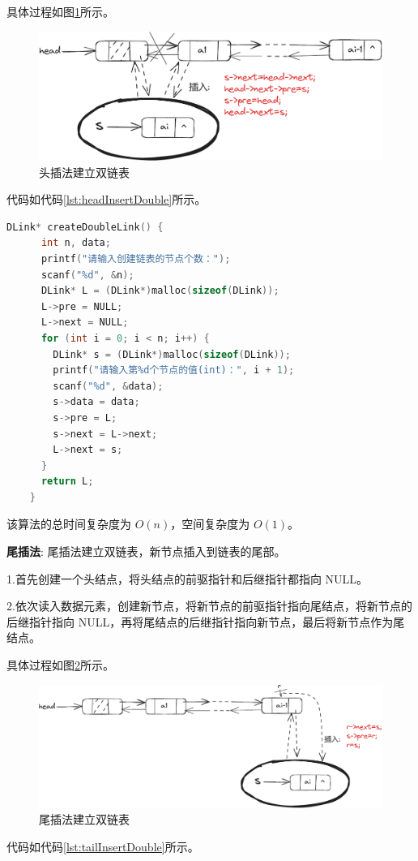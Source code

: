 \documentclass[lang=cn,newtx,10pt,scheme=chinese]{../elegantbook}
\begin{document}
  具体过程如图\ref{fig:headInsertDouble}所示。
  \begin{figure}[!htbp]
    \centering
    \includegraphics[width=1\textwidth]{./figure/pdf/cropped/headInsertDL.pdf}
    \caption{头插法建立双链表}
    \label{fig:headInsertDouble}
  \end{figure}
  代码如代码\ref{lst:headInsertDouble}所示。
  \begin{lstlisting}[language=C++, caption={头插法建立双链表示例代码}, label={lst:headInsertDouble}]
    DLink* createDoubleLink() {
      int n, data;
      printf("请输入创建链表的节点个数：");
      scanf("%d", &n);
      DLink* L = (DLink*)malloc(sizeof(DLink));
      L->pre = NULL;
      L->next = NULL;
      for (int i = 0; i < n; i++) {
        DLink* s = (DLink*)malloc(sizeof(DLink));
        printf("请输入第%d个节点的值(int)：", i + 1);
        scanf("%d", &data);
        s->data = data;
        s->pre = L;
        s->next = L->next;
        L->next = s;
      }
      return L;
    }
  \end{lstlisting}
  该算法的总时间复杂度为 $O(n)$，空间复杂度为 $O(1)$。
 
  \textbf{尾插法}:
  尾插法建立双链表，新节点插入到链表的尾部。

  1.首先创建一个头结点，将头结点的前驱指针和后继指针都指向 NULL。

  2.依次读入数据元素，创建新节点，将新节点的前驱指针指向尾结点，将新节点的后继指针指向 NULL，再将尾结点的后继指针指向新节点，最后将新节点作为尾结点。

  具体过程如图\ref{fig:tailInsertDouble}所示。
  \begin{figure}[!htbp]
    \centering
    \includegraphics[width=1\textwidth]{./figure/pdf/cropped/tailInsertDL.pdf}
    \caption{尾插法建立双链表}
    \label{fig:tailInsertDouble}
  \end{figure}
  代码如代码\ref{lst:tailInsertDouble}所示。
\end{document}
